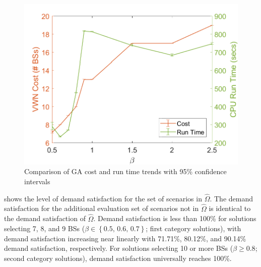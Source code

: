 \documentclass[12pt,dvipsnames]{report}
\begin{document}
\begin{figure}[htp]
	\centering
	\includegraphics[height=0.4\textheight]{Figures/CaseI_GAComparisonCostRuntime}
	\caption[Comparison of GA approach cost and run time for Case I simulations]{Comparison of GA cost and run time trends with 95\% confidence intervals}
	\label{fig:CaseI_GAComparisonCostRunTime}
\end{figure}

 shows the level of demand satisfaction for the set of scenarios in $\hat{\Omega}$.  The demand satisfaction for the additional evaluation set of scenarios not in $\hat{\Omega}$ is identical to the demand satisfaction of $\hat{\Omega}$.  Demand satisfaction is less than 100\% for solutions selecting 7, 8, and 9 BSs ($\beta \in \left\{ 0.5,\, 0.6,\, 0.7 \right\}$; first category solutions), with demand satisfaction increasing near linearly with 71.71\%, 80.12\%, and 90.14\% demand satisfaction, respectively.  For solutions selecting 10 or more BSs ($\beta \geq 0.8$; second category solutions), demand satisfaction universally reaches 100\%.
\end{document}
